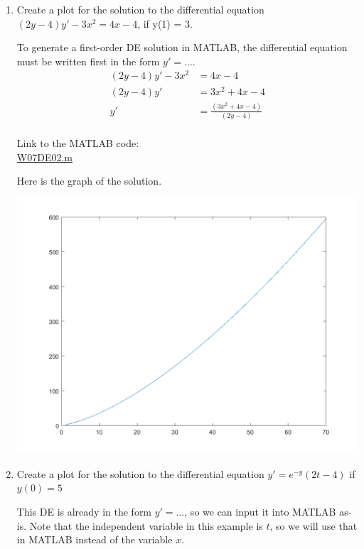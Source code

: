 \begin{enumerate}
\begin{Solution}
    
\end{Solution}


\item
\begin{Question}
Create a plot for the solution to the differential equation
  $(2y - 4)y' - 3x^2 = 4x - 4$, if y(1) = 3.
    
\end{Question}

\begin{Solution}
  To generate a first-order DE solution in MATLAB, the differential
  equation must be written first in the form $y' = \ldots$.
  \begin{align*}
    (2y - 4)y' - 3x^2 & = 4x - 4 \\
    (2y - 4)y' & =  3x^2 +4x - 4 \\
    y' & =  \frac{(3x^2 +4x - 4)}{(2y - 4)} \\
  \end{align*}
    
Link to the MATLAB code: \\
\href{http://www.mast.queensu.ca/~apsc171/MNTCP01/PracticeProblems/MATLAB/W07DE02.m}{W07DE02.m}

Here is the graph of the solution.

\includegraphics[width = 0.5\linewidth]{graphics/Week07_DESolutions/W07DE02}
\end{Solution}


\item
\begin{Question}
Create a plot for the solution to the differential equation
  $y' = e^{-y}(2t - 4)$ if $y(0) = 5$
    
\end{Question}

\begin{Solution}
  This DE is already in the form $y' = \ldots$, so we can input it
  into MATLAB as-is.  Note that the independent variable in this
  example is $t$, so we will use that in MATLAB instead of the
  variable $x$.



\end{Solution}
\end{enumerate}
